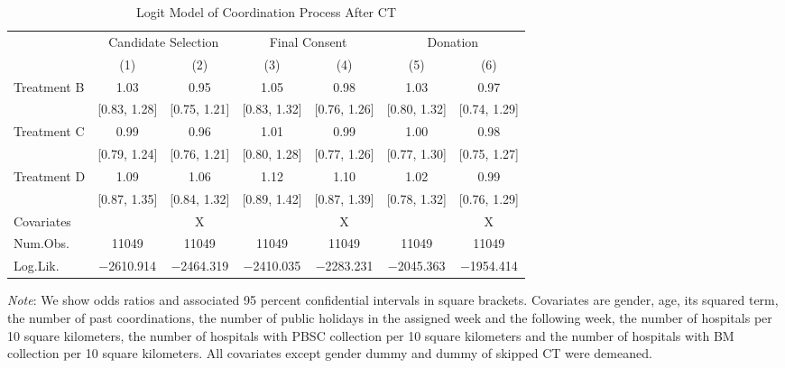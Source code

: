 \documentclass[12pt, a4paper]{article}
\begin{document}
\begin{table}[H]

\caption{\label{tab:logit-coordinate}Logit Model of Coordination Process After CT}
\centering
\fontsize{8}{10}\selectfont
\begin{threeparttable}
\begin{tabular}[t]{lcccccc}
\toprule
\multicolumn{1}{c}{ } & \multicolumn{2}{c}{Candidate Selection} & \multicolumn{2}{c}{Final Consent} & \multicolumn{2}{c}{Donation} \\
\cmidrule(l{3pt}r{3pt}){2-3} \cmidrule(l{3pt}r{3pt}){4-5} \cmidrule(l{3pt}r{3pt}){6-7}
  & (1) & (2) & (3) & (4) & (5) & (6)\\
\midrule
Treatment B & \num{1.03} & \num{0.95} & \num{1.05} & \num{0.98} & \num{1.03} & \num{0.97}\\
 & {}[\num{0.83}, \num{1.28}] & {}[\num{0.75}, \num{1.21}] & {}[\num{0.83}, \num{1.32}] & {}[\num{0.76}, \num{1.26}] & {}[\num{0.80}, \num{1.32}] & {}[\num{0.74}, \num{1.29}]\\
Treatment C & \num{0.99} & \num{0.96} & \num{1.01} & \num{0.99} & \num{1.00} & \num{0.98}\\
 & {}[\num{0.79}, \num{1.24}] & {}[\num{0.76}, \num{1.21}] & {}[\num{0.80}, \num{1.28}] & {}[\num{0.77}, \num{1.26}] & {}[\num{0.77}, \num{1.30}] & {}[\num{0.75}, \num{1.27}]\\
Treatment D & \num{1.09} & \num{1.06} & \num{1.12} & \num{1.10} & \num{1.02} & \num{0.99}\\
 & {}[\num{0.87}, \num{1.35}] & {}[\num{0.84}, \num{1.32}] & {}[\num{0.89}, \num{1.42}] & {}[\num{0.87}, \num{1.39}] & {}[\num{0.78}, \num{1.32}] & {}[\num{0.76}, \num{1.29}]\\
\midrule
Covariates &  & X &  & X &  & X\\
Num.Obs. & \num{11049} & \num{11049} & \num{11049} & \num{11049} & \num{11049} & \num{11049}\\
Log.Lik. & \num{-2610.914} & \num{-2464.319} & \num{-2410.035} & \num{-2283.231} & \num{-2045.363} & \num{-1954.414}\\
\bottomrule
\end{tabular}
\begin{tablenotes}
\item \emph{Note}: We show odds ratios and associated 95 percent confidential intervals in square brackets. Covariates are gender, age, its squared term, the number of past coordinations, the number of public holidays in the assigned week and the following week, the number of hospitals per 10 square kilometers, the number of hospitals with PBSC collection per 10 square kilometers and the number of hospitals with BM collection per 10 square kilometers. All covariates except gender dummy and dummy of skipped CT were demeaned.
\end{tablenotes}
\end{threeparttable}
\end{table}

\clearpage


\end{document}
